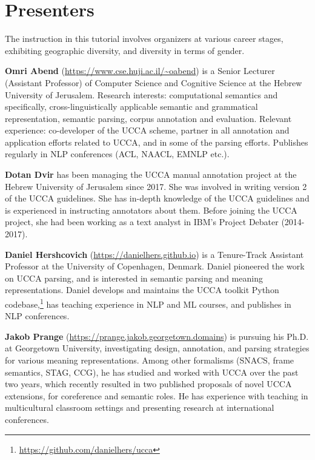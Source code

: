 \documentclass[11pt,table]{article}
\begin{document}
\section{Presenters}\label{sec:instructors}

The instruction in this tutorial involves organizers at various
career stages, exhibiting geographic diversity, and diversity in terms of 
gender.

\textbf{Omri Abend} (\url{https://www.cse.huji.ac.il/~oabend})
is a Senior Lecturer (Assistant Professor) of Computer Science and Cognitive Science
at the Hebrew University of Jerusalem.
Research interests:
computational semantics and specifically, cross-linguistically applicable
semantic and grammatical representation, semantic parsing, corpus annotation and evaluation.
Relevant experience: co-developer of the UCCA scheme, partner in all annotation and application efforts related to UCCA, and in some of the parsing efforts. Publishes regularly in NLP conferences (ACL, NAACL, EMNLP etc.).

\textbf{Dotan Dvir} has been managing the UCCA manual annotation project at the Hebrew University of Jerusalem since 2017. She was involved in writing version 2 of the UCCA guidelines. She has in-depth knowledge of the UCCA guidelines and is experienced in instructing annotators about them. Before joining the UCCA project, she had been working as a text analyst in IBM's Project Debater (2014-2017).

\textbf{Daniel Hershcovich} (\url{https://danielhers.github.io})
is a Tenure-Track Assistant Professor at the University of Copenhagen, Denmark.
Daniel pioneered the work on UCCA parsing, and
is interested in semantic parsing and meaning representations.
Daniel develops and maintains the UCCA toolkit Python codebase,\footnote{\url{https://github.com/danielhers/ucca}}
has teaching experience in NLP and ML courses,
and publishes in NLP conferences.

\textbf{Jakob Prange} (\url{https://prange.jakob.georgetown.domains})
is pursuing his Ph.D. at Georgetown University, investigating design, annotation, and parsing strategies for various meaning representations.
Among other formalisms (SNACS, frame semantics, STAG, CCG), he has studied and worked with UCCA over the past two years, which recently resulted in two published proposals of novel UCCA extensions, for coreference and semantic roles.
He has experience with teaching in multicultural classroom settings and presenting research at international conferences.
\end{document}
